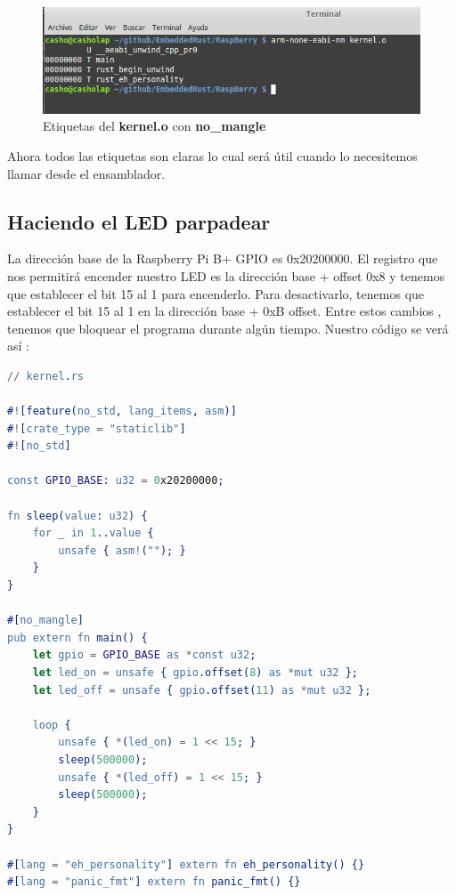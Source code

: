 \documentclass[12pt, twoside]{report}
\begin{document}
\begin{figure}
	\centering	\includegraphics[width=1\linewidth]{rust_kernel4.png}
	\caption{Etiquetas del \textbf{kernel.o} con \textbf{no\_mangle}}
	\label{fig0004}
\end{figure}

Ahora todos las etiquetas son claras lo cual será útil cuando lo necesitemos llamar desde el ensamblador.

\subsection{Haciendo el LED parpadear}

La dirección base de la Raspberry Pi B+ GPIO es 0x20200000. El registro que nos permitirá encender nuestro LED es la dirección base + offset 0x8 y tenemos que establecer el bit 15 al 1 para encenderlo. Para desactivarlo, tenemos que establecer el bit 15 al 1 en la dirección base + 0xB offset. Entre estos cambios , tenemos que bloquear el programa durante algún tiempo. Nuestro código se verá así :

\begin{lstlisting}[language=erlang]
// kernel.rs

#![feature(no_std, lang_items, asm)]
#![crate_type = "staticlib"]
#![no_std]

const GPIO_BASE: u32 = 0x20200000;

fn sleep(value: u32) {  
    for _ in 1..value {
        unsafe { asm!(""); }
    }
}

#[no_mangle]
pub extern fn main() {  
    let gpio = GPIO_BASE as *const u32;
    let led_on = unsafe { gpio.offset(8) as *mut u32 };
    let led_off = unsafe { gpio.offset(11) as *mut u32 };

    loop {
        unsafe { *(led_on) = 1 << 15; }
        sleep(500000);
        unsafe { *(led_off) = 1 << 15; }
        sleep(500000);
    }
}

#[lang = "eh_personality"] extern fn eh_personality() {}
#[lang = "panic_fmt"] extern fn panic_fmt() {}
\end{lstlisting}
\end{document}
